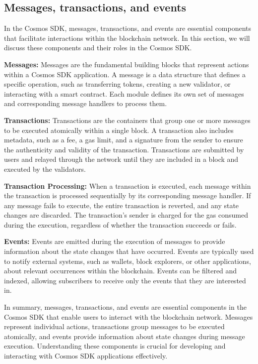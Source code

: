 \documentclass{article}
\begin{document}
\subsection{Messages, transactions, and events}

In the Cosmos SDK, messages, transactions, and events are essential components that facilitate interactions within the blockchain network. In this section, we will discuss these components and their roles in the Cosmos SDK.

\textbf{Messages:} Messages are the fundamental building blocks that represent actions within a Cosmos SDK application. A message is a data structure that defines a specific operation, such as transferring tokens, creating a new validator, or interacting with a smart contract. Each module defines its own set of messages and corresponding message handlers to process them.

\textbf{Transactions:} Transactions are the containers that group one or more messages to be executed atomically within a single block. A transaction also includes metadata, such as a fee, a gas limit, and a signature from the sender to ensure the authenticity and validity of the transaction. Transactions are submitted by users and relayed through the network until they are included in a block and executed by the validators.

\textbf{Transaction Processing:} When a transaction is executed, each message within the transaction is processed sequentially by its corresponding message handler. If any message fails to execute, the entire transaction is reverted, and any state changes are discarded. The transaction's sender is charged for the gas consumed during the execution, regardless of whether the transaction succeeds or fails.

\textbf{Events:} Events are emitted during the execution of messages to provide information about the state changes that have occurred. Events are typically used to notify external systems, such as wallets, block explorers, or other applications, about relevant occurrences within the blockchain. Events can be filtered and indexed, allowing subscribers to receive only the events that they are interested in.

In summary, messages, transactions, and events are essential components in the Cosmos SDK that enable users to interact with the blockchain network. Messages represent individual actions, transactions group messages to be executed atomically, and events provide information about state changes during message execution. Understanding these components is crucial for developing and interacting with Cosmos SDK applications effectively.
\end{document}
